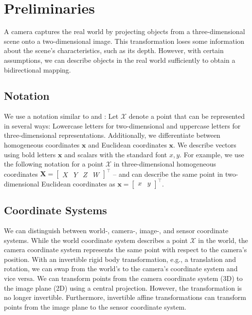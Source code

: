 \section{Preliminaries}
\label{sec:background}
A camera captures the real world by projecting objects from a 
three-dimensional scene onto a two-dimensional image. 
This transformation loses some information about the scene's characteristics, 
such as its depth.
However, with certain assumptions, we can describe objects in the 
real world sufficiently to obtain a bidirectional mapping.

\subsection{Notation}
We use a notation similar to \cite{Hartley_Zisserman_2004} and 
\cite{forstner2016photogrammetric}:
Let $\mathcal{X}$ denote a point that can be represented in several ways: 
Lowercase letters for two-dimensional and uppercase letters 
for three-dimensional representations.
Additionally, we differentiate between homogeneous coordinates $\mathbf{x}$
and Euclidean coordinates $\boldsymbol{x}$. We describe vectors using
bold letters $\mathbf{x}$ and scalars with the standard font $x, y$.
For example, we use the following notation for a point $\mathcal{X}$ 
in three-dimensional homogeneous coordinates 
$\mathbf{X} = \begin{bmatrix} X & Y & Z & W \end{bmatrix}^\top$ -- and can 
describe the same point in two-dimensional Euclidean coordinates
as $\boldsymbol{x} = \begin{bmatrix} x & y \end{bmatrix}^\top$.

\subsection{Coordinate Systems}
We can distinguish between world-, camera-, image-, and sensor 
coordinate systems. While the world coordinate system describes a 
point $\mathcal{X}$ in the world, the camera coordinate system represents 
the same point with respect to the camera's position. With an invertible 
rigid body transformation, e.g., a translation and rotation, we can 
swap from the world's to the camera's coordinate system and vice versa. 
We can transform points from the camera coordinate system (3D) to the 
image plane (2D) using a central projection. However, the transformation is 
no longer invertible. Furthermore, invertible affine transformations 
can transform points from the image plane to the sensor coordinate system.

